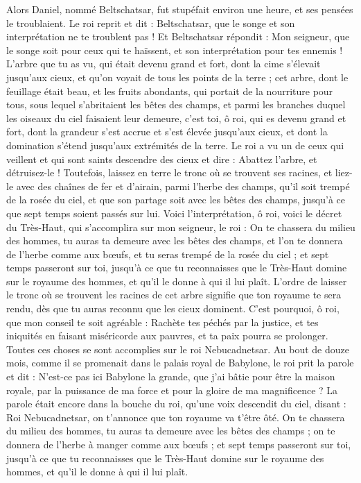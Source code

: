 \begin{multicols}{2}
Alors Daniel, nommé Beltschatsar, fut stupéfait environ une heure, et ses pensées le troublaient. Le roi reprit et dit : Beltschatsar, que le songe et son interprétation ne te troublent pas ! Et Beltschatsar répondit : Mon seigneur, que le songe soit pour ceux qui te haïssent, et son interprétation pour tes ennemis !
L'arbre que tu as vu, qui était devenu grand et fort, dont la cime s’élevait jusqu’aux cieux, et qu’on voyait de tous les points de la terre ;
cet arbre, dont le feuillage était beau, et les fruits abondants, qui portait de la nourriture pour tous, sous lequel s’abritaient les bêtes des champs, et parmi les branches duquel les oiseaux du ciel faisaient leur demeure,
c’est toi, ô roi, qui es devenu grand et fort, dont la grandeur s'est accrue et s’est élevée jusqu'aux cieux, et dont la domination s’étend jusqu’aux extrémités de la terre.
Le roi a vu un de ceux qui veillent et qui sont saints descendre des cieux et dire : Abattez l'arbre, et détruisez-le ! Toutefois, laissez en terre le tronc où se trouvent ses racines, et liez-le avec des chaînes de fer et d'airain, parmi l'herbe des champs, qu'il soit trempé de la rosée du ciel, et que son partage soit avec les bêtes des champs, jusqu'à ce que sept temps soient passés sur lui.
Voici l'interprétation, ô roi, voici le décret du Très-Haut, qui s’accomplira sur mon seigneur, le roi :
On te chassera du milieu des hommes, tu auras ta demeure avec les bêtes des champs, et l’on te donnera de l'herbe comme aux bœufs, et tu seras trempé de la rosée du ciel ; et sept temps passeront sur toi, jusqu’à ce que tu reconnaisses que le Très-Haut domine sur le royaume des hommes, et qu'il le donne à qui il lui plaît.
L’ordre de laisser le tronc où se trouvent les racines de cet arbre signifie que ton royaume te sera rendu, dès que tu auras reconnu que les cieux dominent.
C'est pourquoi, ô roi, que mon conseil te soit agréable : Rachète tes péchés par la justice, et tes iniquités en faisant miséricorde aux pauvres, et ta paix pourra se prolonger.
Toutes ces choses se sont accomplies sur le roi Nebucadnetsar.
Au bout de douze mois, comme il se promenait dans le palais royal de Babylone,
le roi prit la parole et dit : N'est-ce pas ici Babylone la grande, que j'ai bâtie pour être la maison royale, par la puissance de ma force et pour la gloire de ma magnificence ?
La parole était encore dans la bouche du roi, qu’une voix descendit du ciel, disant : Roi Nebucadnetsar, on t'annonce que ton royaume va t’être ôté.
On te chassera du milieu des hommes, tu auras ta demeure avec les bêtes des champs ; on te donnera de l'herbe à manger comme aux bœufs ; et sept temps passeront sur toi, jusqu’à ce que tu reconnaisses que le Très-Haut domine sur le royaume des hommes, et qu'il le donne à qui il lui plaît.

\end{multicols}
